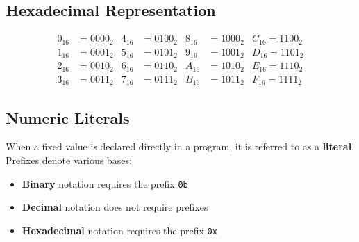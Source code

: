 \documentclass[a4paper]{report}
\begin{document}
\subsection{Hexadecimal Representation}
\begin{align*}
    0_{16} & = 0000_2 & 4_{16} & = 0100_2 & 8_{16} & = 1000_2 & C_{16} = 1100_2 \\
    1_{16} & = 0001_2 & 5_{16} & = 0101_2 & 9_{16} & = 1001_2 & D_{16} = 1101_2 \\
    2_{16} & = 0010_2 & 6_{16} & = 0110_2 & A_{16} & = 1010_2 & E_{16} = 1110_2 \\
    3_{16} & = 0011_2 & 7_{16} & = 0111_2 & B_{16} & = 1011_2 & F_{16} = 1111_2
\end{align*}
\subsection{Numeric Literals}
When a fixed value is declared directly in a program, it is referred to as a \textbf{literal}.
Prefixes denote various bases:
\begin{itemize}
    \item \textbf{Binary} notation requires the prefix \texttt{0b}
    \item \textbf{Decimal} notation does not require prefixes
    \item \textbf{Hexadecimal} notation requires the prefix \texttt{0x}
\end{itemize}
\end{document}
